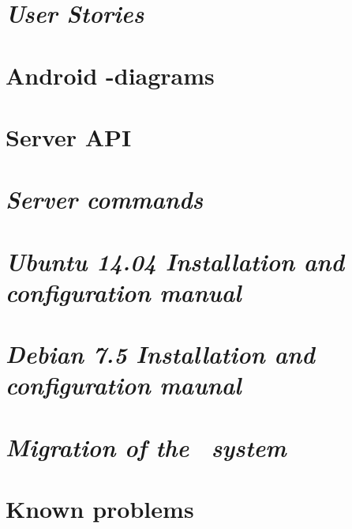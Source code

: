 \begin{appendix}

\chapter{\textit{User Stories}}

\chapter{Android -diagrams}

\chapter{Server API}

\chapter{\textit{Server commands}}

\chapter{\textit{Ubuntu 14.04 Installation and configuration manual}}

\chapter{\textit{Debian 7.5 Installation and configuration maunal}}

\chapter{\textit{Migration of the \appName\ system}}

\chapter{Known problems}
\label{chap:knownProblems}
%
\end{appendix}
